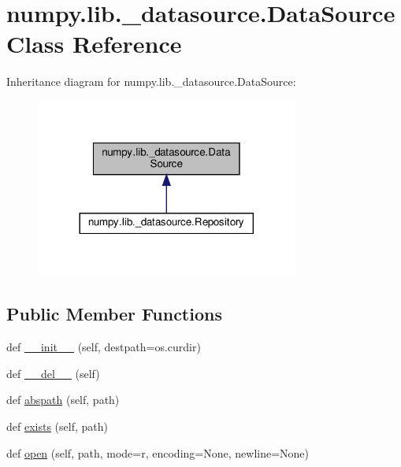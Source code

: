 \hypertarget{classnumpy_1_1lib_1_1__datasource_1_1DataSource}{}\section{numpy.\+lib.\+\_\+datasource.\+Data\+Source Class Reference}
\label{classnumpy_1_1lib_1_1__datasource_1_1DataSource}


Inheritance diagram for numpy.\+lib.\+\_\+datasource.\+Data\+Source\+:
\nopagebreak
\begin{figure}[H]
\begin{center}
\leavevmode
\includegraphics[width=245pt]{classnumpy_1_1lib_1_1__datasource_1_1DataSource__inherit__graph}
\end{center}
\end{figure}
\subsection*{Public Member Functions}
\begin{DoxyCompactItemize}
\item 
def \hyperlink{classnumpy_1_1lib_1_1__datasource_1_1DataSource_a7bfdf9b0b7d6b4d8867e8f84b9cbed49}{\+\_\+\+\_\+init\+\_\+\+\_\+} (self, destpath=os.\+curdir)
\item 
def \hyperlink{classnumpy_1_1lib_1_1__datasource_1_1DataSource_ae4ba92c5cb4b68578086c3591efbf5fc}{\+\_\+\+\_\+del\+\_\+\+\_\+} (self)
\item 
def \hyperlink{classnumpy_1_1lib_1_1__datasource_1_1DataSource_a23e237ed3648077ffa3aac44ac47d2b6}{abspath} (self, path)
\item 
def \hyperlink{classnumpy_1_1lib_1_1__datasource_1_1DataSource_a587b7321605892c251f765216a973f52}{exists} (self, path)
\item 
def \hyperlink{classnumpy_1_1lib_1_1__datasource_1_1DataSource_a5192a91989e5bc0a3bc6dcb6b5939f87}{open} (self, path, mode=\textquotesingle{}r\textquotesingle{}, encoding=None, newline=None)
\end{DoxyCompactItemize}


